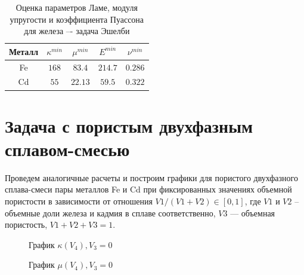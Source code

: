 \documentclass[12pt,a4paper]{article}
\begin{document}
\begin{table}[h!]
    \centering
    \begin{tabular}{|c|c|c|c|c|}
        \hline 
        Металл & $ \kappa^{min}$ & $\mu^{min}$ & $E^{min}$ & $\nu^{min}$ \\
        \hline 
        Fe & $168$ & $83.4$ & $214.7$ & $0.286$ \\
        \hline
        Cd & $55$ & $22.13$ & $59.5$ & $0.322$ \\
        \hline 
    \end{tabular}
    \vspace{3mm}
    \caption{Оценка параметров Ламе, модуля упругости и коэффициента Пуассона для железа –- задача Эшелби}
 \end{table}

 \section{Задача с пористым двухфазным сплавом-смесью}

 Проведем аналогичные расчеты и построим графики для пористого двухфазного сплава-смеси пары металлов Fe и Cd при фиксированных значениях объемной пористости в зависимости от отношения $V1/(V1 + V2) \in [0, 1]$, где $V1$ и $V2$ -- объемные доли железа и кадмия в сплаве соответственно, $V3$ — объемная пористость, $V1 + V2 + V3 = 1$.

    \begin{figure}[h]
        \caption{График $\kappa(V_4), V_3 = 0$}
    \end{figure}

    \pagebreak

    \begin{figure}[h]
        \caption{График $\mu(V_4), V_3 = 0$}
    \end{figure}
\end{document}
